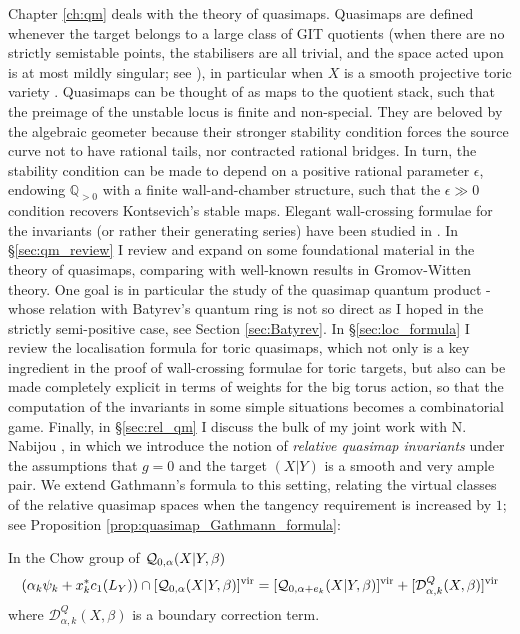 Chapter \ref{ch:qm} deals with the theory of quasimaps. Quasimaps are defined whenever the target belongs to a large class of GIT quotients (when there are no strictly semistable points, the stabilisers are all trivial, and the space acted upon is at most mildly singular; see \cite{CFKM}), in particular when $X$ is a smooth projective toric variety \cite{CF-K}. Quasimaps can be thought of as maps to the quotient stack, such that the preimage of the unstable locus is finite and non-special. They are beloved by the algebraic geometer because their stronger stability condition forces the source curve not to have rational tails, nor contracted rational bridges. In turn, the stability condition can be made to depend on a positive rational parameter $\epsilon$, endowing $\mathbb Q_{>0}$ with a finite wall-and-chamber structure, such that the $\epsilon\gg0$ condition recovers Kontsevich's stable maps. Elegant wall-crossing formulae for the invariants (or rather their generating series) have been studied in \cites{TodaStableQuotient,CF-K-wallcrossing,CF-K-MirrorSymmetry,CF-K-higher-genus,CladerJandaRuan}. In \S \ref{sec:qm_review} I review and expand on some foundational material in the theory of quasimaps, comparing with well-known results in Gromov-Witten theory. One goal is in particular the study of the quasimap quantum product - whose relation with Batyrev's quantum ring is not so direct as I hoped in the strictly semi-positive case, see Section \ref{sec:Batyrev}. In \S \ref{sec:loc_formula} I review the localisation formula for toric quasimaps, which not only is a key ingredient in the proof of wall-crossing formulae for toric targets, but also can be made completely explicit in terms of weights for the big torus action, so that the computation of the invariants in some simple situations becomes a combinatorial game. Finally, in \S \ref{sec:rel_qm} I discuss the bulk of my joint work with N. Nabijou \cite{BN}, in which we introduce the notion of \emph{relative quasimap invariants} under the assumptions that $g=0$ and the target $(X|Y)$ is a smooth and very ample pair. We extend Gathmann's formula \cite{Ga} to this setting, relating the virtual classes of the relative quasimap spaces when the tangency requirement is increased by $1$; see Proposition \ref{prop:quasimap_Gathmann_formula}:
\begin{prop*} In the Chow group of $\mathcal{Q}_{0,\alpha}(X|Y,\beta)$
 \begin{equation*} (\alpha_k \psi_k + x_k^*c_1(L_Y)) \cap [\mathcal{Q}_{0,\alpha}(X|Y,\beta)]^{\mathrm{vir}} = [\mathcal{Q}_{0,\alpha+e_k}(X|Y,\beta)]^{\mathrm{vir}} + [\mathcal{D}^Q_{\alpha,k}(X,\beta)]^{\mathrm{vir}} \end{equation*}
where $\mathcal{D}^Q_{\alpha,k}(X,\beta)$ is a boundary correction term. \end{prop*}
